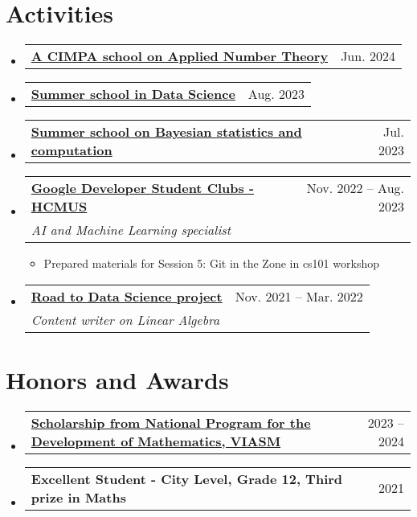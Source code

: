 \documentclass[letterpaper,11pt]{article}
\makeatletter
\newcommand{\heading}[4]{
    \normalsize
    \begin{tabular*}{0.97\textwidth}[t]{l@{\extracolsep{\fill}}r}
      \textbf{#1} & #2 \\[-2pt]
      \textit{\small#3} & \textit{\small #4}
    \end{tabular*}
    \vspace{-2pt}
}
\newcommand{\subheading}[2]{
    \normalsize
    \begin{tabular*}{0.97\textwidth}[t]{l@{\extracolsep{\fill}}r}
      \textbf{#1} & #2 \\
    \end{tabular*}
    \vspace{-2pt}
}
\makeatother
\begin{document}
\section{Activities}
\begin{itemize}
    \item \subheading{\href{http://www.rnta.eu/HCMC2024/index.html}{A CIMPA school on Applied Number Theory \faExternalLink}}{Jun. 2024}

    \item \subheading{\href{https://viasm.edu.vn/hdkh/ssds2023}{Summer school in Data Science \faExternalLink}}{Aug. 2023}
    
    \item \subheading{\href{https://viasm.edu.vn/hdkh/somsaml}{Summer school on Bayesian statistics and computation \faExternalLink}}{Jul. 2023}

    \item \heading{\href{https://www.facebook.com/gdgoc.hcmus}{Google Developer Student Clubs - HCMUS \faExternalLink}}{Nov. 2022 -- Aug. 2023}{AI and Machine Learning specialist}{}
        \begin{itemize}
            \item Prepared materials for Session 5: Git in the Zone in cs101 workshop
        \end{itemize}
    
    \item \heading{\href{https://www.facebook.com/RDSproject/}{Road to Data Science project \faExternalLink}}{Nov. 2021 -- Mar. 2022}{Content writer on Linear Algebra}{}
\end{itemize}



\section{Honors and Awards}
\begin{itemize}
    \item \subheading{\href{https://viasm.edu.vn/hoat-dong-khoa-hoc/tin-tuc/chi-tiet/hoc-bong-chuong-trinh-toan-nam-hoc-2023-2024}{\small Scholarship from National Program for the Development of Mathematics, VIASM \faExternalLink}}{2023 -- 2024}
    
    \item \subheading{\small Excellent Student - City Level, Grade 12, Third prize in Maths}{2021}
\end{itemize}
\end{document}
